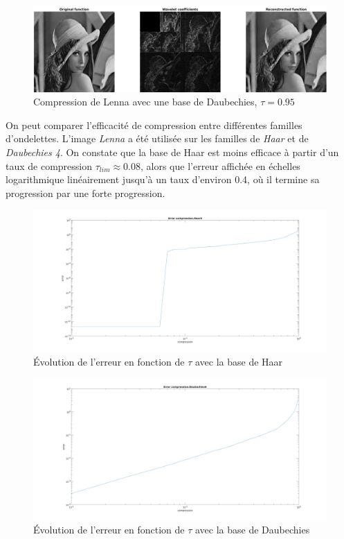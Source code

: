 \documentclass[a4paper,12pt, openany, twoside]{article}
\theoremstyle{break}
\begin{document}
\begin{figure}[H]
  \centering
  \includegraphics[width=\textwidth]{comp_LennaDaubechies95.png}\vfill
  \caption{Compression de Lenna avec une base de Daubechies, $\tau=0.95$}
\end{figure}


On peut comparer l'efficacité de compression entre différentes familles d'ondelettes. L'image \textit{Lenna} a été utilisée sur les familles de \textit{Haar} et de \textit{Daubechies 4}. On constate que la base de Haar est moins efficace à partir d'un taux de compression $\tau_{lim} \approx 0.08$, alors que l'erreur affichée en échelles logarithmique linéairement jusqu'à un taux d'environ 0.4, où il termine sa progression par une forte progression.


\begin{figure}[H]
  \centering
  \includegraphics[width=\textwidth]{error_comp_Haar4}\hfill
  \caption{Évolution de l'erreur en fonction de $\tau$ avec la base de Haar}
\end{figure}


\begin{figure}[H]
  \centering
  \includegraphics[width=\textwidth]{error_comp_Daubechies4}\hfill
  \caption{Évolution de l'erreur en fonction de $\tau$ avec la base de Daubechies}
\end{figure}
\end{document}

